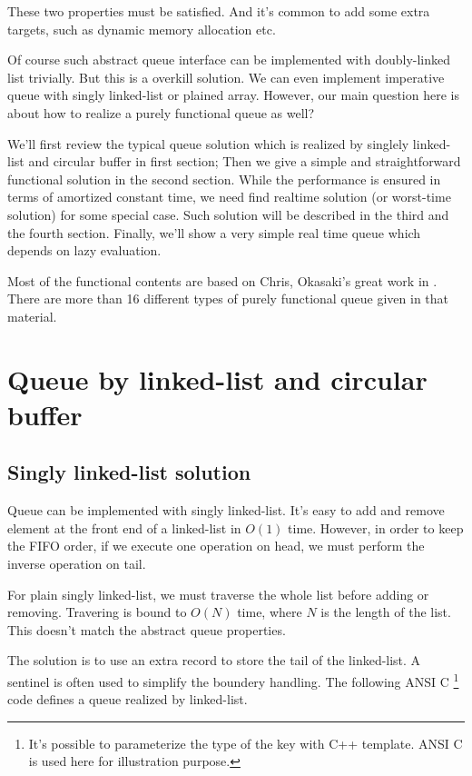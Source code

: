 \documentclass{article}
\begin{document}
These two properties must be satisfied. And it's common to add some extra
targets, such as dynamic memory allocation etc.

Of course such abstract queue interface can be implemented with 
doubly-linked list trivially. But this is a overkill solution. 
We can even implement imperative queue with singly linked-list or
plained array. However, our main question here is about how to realize
a purely functional queue as well?

We'll first review the typical queue solution which is realized by
singlely linked-list and circular buffer in first section; Then we
give a simple and straightforward functional solution in the second
section. While the performance is ensured in terms of amortized
constant time, we need find realtime solution (or worst-time solution)
for some special case. Such solution will be described in the third
and the fourth section. Finally, we'll show a very simple real time
queue which depends on lazy evaluation.

Most of the functional contents are based on Chris, Okasaki's great
work in \cite{okasaki-book}. There are more than 16 different types
of purely functional queue given in that material.

\section{Queue by linked-list and circular buffer}

\subsection{Singly linked-list solution}

Queue can be implemented with singly linked-list. It's easy to add 
and remove element at the front end of a linked-list in $O(1)$ time. 
However, in
order to keep the FIFO order, if we execute one operation on head,
we must perform the inverse operation on tail.

For plain singly linked-list, we must traverse the whole list before
adding or removing. Travering is bound to $O(N)$ time, 
where $N$ is the length of the list. This doesn't match the abstract
queue properties.

The solution is to use an extra record to store the tail of the linked-list.
A sentinel is often used to simplify the boundery handling. The 
following ANSI C \footnote{It's possible to parameterize the type of the key
with C++ template. ANSI C is used here for illustration purpose.} 
code defines a queue realized by linked-list.
\end{document}
